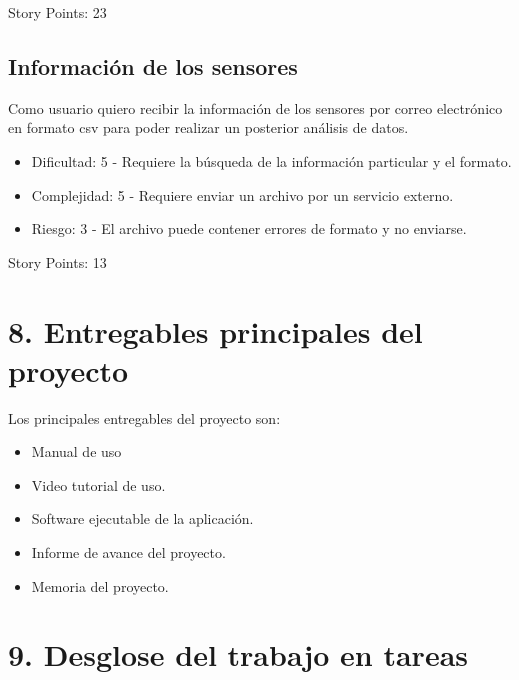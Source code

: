 \documentclass[
11pt, %
]{charter}
\begin{document}
Story Points: 23
\subsection{Información de los sensores}
Como usuario quiero recibir la información de los sensores por correo electrónico en formato csv para poder realizar un posterior análisis de datos.
\begin{itemize}
	\item Dificultad: 5 - Requiere la búsqueda de la información particular y el formato.
	\item Complejidad: 5 - Requiere enviar un archivo por un servicio externo.
	\item Riesgo: 3 - El archivo puede contener errores de formato y no enviarse.
\end{itemize}

Story Points: 13
\section{8. Entregables principales del proyecto}
\label{sec:entregables}


Los principales entregables del proyecto son:

\begin{itemize}
	\item Manual de uso 
	\item Video tutorial de uso.
	\item Software ejecutable de la aplicación.
	\item Informe de avance del proyecto.
	\item Memoria del proyecto.
\end{itemize}


\section{9. Desglose del trabajo en tareas}
\label{sec:wbs}
\end{document}
